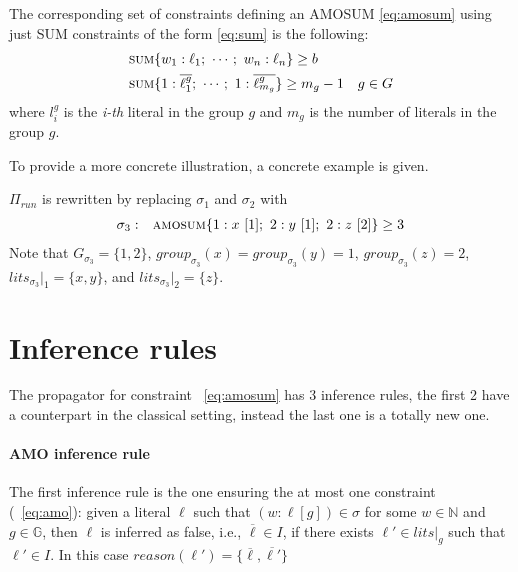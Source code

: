 The corresponding set of constraints defining an AMOSUM \eqref{eq:amosum} using just SUM constraints of the form \eqref{eq:sum}
is the following:
\begin{align*}
    & \textsc{sum}\{w_1 : \ell_1;\ \cdots;\ w_n : \ell_n\} \geq b\\
    & \textsc{sum}\{1 : \overline{\ell_{1}^g};\ \cdots;\ 1 : \overline{\ell_{m_{g}}^g}\} \geq m_{g} - 1 \quad g \in G
\end{align*}
where $l_{i}^g$ is the \textit{i-th} literal in the group $g$ and $m_{g}$ is the number of literals in the group $g$.

To provide a more concrete illustration,
a concrete example is given.
\begin{example}\label{ex:running-revised}
    $\Pi_{\mathit{run}}$ is rewritten by replacing $\sigma_1$ and $\sigma_2$ with
    \begin{align*}
    \begin{array}{rl}
        \sigma_{3}: & \textsc{amosum}\{
            1 : x\ [1];\ 2 : y\ [1];\ 2 : z\ [2]
        \} \geq 3
    \end{array}
    \end{align*}
    Note that $\mathit{G}_{\sigma_3}=\{1, 2\}$, 
    $\mathit{group}_{\sigma_{3}}(x) = \mathit{group}_{\sigma_{3}}(y) = 1$, 
    $\mathit{group}_{\sigma_{3}}(z) = 2$, 
    $\mathit{lits}_{\sigma_{3}}|_1 = \{x, y\}$, and
    $\mathit{lits}_{\sigma_{3}}|_2 = \{z\}$.
\end{example}
\section{Inference rules}
\label{sec:amo:inference_rules}
The propagator for constraint ~\ref{eq:amosum} has 3 inference rules,
the first 2 have a counterpart in the classical setting, instead the last
one is a totally new one.

\paragraph{AMO inference rule} 
The first inference rule is the one ensuring the at most one constraint 
(~\ref{eq:amo}): given a literal 
$\ell$ such that $(w : \ell [g]) \in \sigma$ for some $w \in \mathbb{N}$ and $g \in \mathbb{G}$,
then $\ell$ is inferred as false, i.e., $\overline{\ell} \in I$, if there exists 
$\ell' \in \mathit{lits}|_g$ such that $\ell' \in I$. In this case
$\mathit{reason}(\ell')=\{\overline{\ell},\overline{\ell'}\}$

